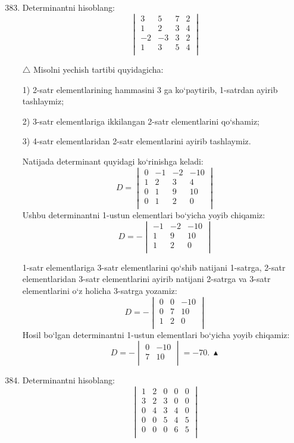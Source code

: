 \begin{enumerate}
	\setcounter{enumi}{382}
	\item Determinantni hisoblang:
	$$\begin{vmatrix}
		3&5&7&2\\
		1&2&3&4\\
		-2&-3&3&2\\
		1&3&5&4\\	
	\end{vmatrix}$$ 

$\triangle$ Misolni yechish tartibi quyidagicha: 

1) 2-satr elementlarining hammasini 3 ga ko`paytirib, 1-satrdan ayirib tashlaymiz; 

2) 3-satr elementlariga ikkilangan 2-satr elementlarini qo`shamiz; 

3) 4-satr elementlaridan 2-satr elementlarini ayirib tashlaymiz.

 Natijada determinant quyidagi ko`rinishga  keladi:
$$D=\begin{vmatrix}
	0&-1&-2&-10\\
	1&2&3&4\\
	0&1&9&10\\
	0&1&2&0\\
\end{vmatrix}$$
Ushbu determinantni 1-ustun elementlari bo`yicha yoyib chiqamiz:
$$D=-\begin{vmatrix}
	-1&-2&-10\\
	1&9&10\\
	1&2&0\\
\end{vmatrix}$$

1-satr elementlariga 3-satr elementlarini qo`shib natijani 1-satrga, 2-satr elementlaridan 3-satr elementlarini ayirib natijani 2-satrga va 3-satr elementlarini o`z holicha 3-satrga yozamiz:
$$D=-\begin{vmatrix}
	0&0&-10\\
	0&7&10\\
	1&2&0\\
\end{vmatrix}$$
Hosil bo`lgan determinantni 1-ustun elementlari bo`yicha yoyib chiqamiz:
$$D=-\begin{vmatrix}
	0&-10\\
	7&10\\
\end{vmatrix}=-70.\ \blacktriangle$$

\item Determinantni hisoblang:
$$\begin{vmatrix}
	1&2&0&0&0\\
	3&2&3&0&0\\
	0&4&3&4&0\\
	0&0&5&4&5\\
	0&0&0&6&5\\
\end{vmatrix}$$


\end{enumerate}

